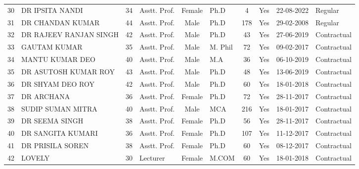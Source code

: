 \documentclass[a4paper]{article} %
\begin{document}
\begin{landscape}
\begin{table}[htbp]
\begin{tabular}{|c|l|c|l|c|l|c|c|c|l|}
30 & \MakeUppercase{DR IPSITA NANDI} & 34 & Asstt. Prof. & Female & Ph.D & 4 & Yes & 22-08-2022 & Regular \\
31 & \MakeUppercase{DR CHANDAN KUMAR} & 44 & Asstt. Prof. & Male & Ph.D & 178 & Yes & 29-02-2008 & Regular \\
\hline
\hline
32 & \MakeUppercase{DR RAJEEV RANJAN SINGH} & 42 & Asstt. Prof. & Male & Ph.D & 43 & Yes & 27-06-2019 & \cellcolor{lightgray}Contractual \\
33 & \MakeUppercase{GAUTAM KUMAR} & 35 & Asstt. Prof. & Male & M. Phil & 72 & Yes & 09-02-2017 & \cellcolor{lightgray}Contractual \\
34 & \MakeUppercase{MANTU KUMAR DEO} & 40 & Asstt. Prof. & Male & M.A & 36 & Yes & 06-10-2019 & \cellcolor{lightgray}Contractual \\
35 & \MakeUppercase{DR ASUTOSH KUMAR ROY} & 43 & Asstt. Prof. & Male & Ph.D & 48 & Yes & 13-06-2019 & \cellcolor{lightgray}Contractual \\
36 & \MakeUppercase{DR SHYAM DEO ROY} & 42 & Asstt. Prof. & Male & Ph.D & 60 & Yes & 18-01-2018 & \cellcolor{lightgray}Contractual \\
37 & \MakeUppercase{DR ARCHANA} & 36 & Asstt. Prof. & Female & Ph.D & 72 & Yes & 28-11-2017 & \cellcolor{lightgray}Contractual \\
38 & \MakeUppercase{SUDIP SUMAN MITRA} & 40 & Asstt. Prof. & Male & MCA & 216 & Yes & 18-01-2017 & \cellcolor{lightgray}Contractual \\
39 & \MakeUppercase{DR SEEMA SINGH} & 38 & Asstt. Prof. & Female & Ph.D & 56 & Yes & 28-11-2017 & \cellcolor{lightgray}Contractual \\
40 & \MakeUppercase{DR SANGITA KUMARI} & 36 & Asstt. Prof. & Female & Ph.D & 107 & Yes & 11-12-2017 & \cellcolor{lightgray}Contractual \\
41 & \MakeUppercase{DR PRISILA SOREN} & 38 & Asstt. Prof. & Female & Ph.D & 60 & Yes & 08-12-2017 & \cellcolor{lightgray}Contractual \\
42 & \MakeUppercase{LOVELY} & 30 & Lecturer & Female & M.COM & 60 & Yes & 18-01-2018 & \cellcolor{lightgray}Contractual \\
\hline
\end{tabular}
\end{table}
\end{landscape} %
\end{document}
